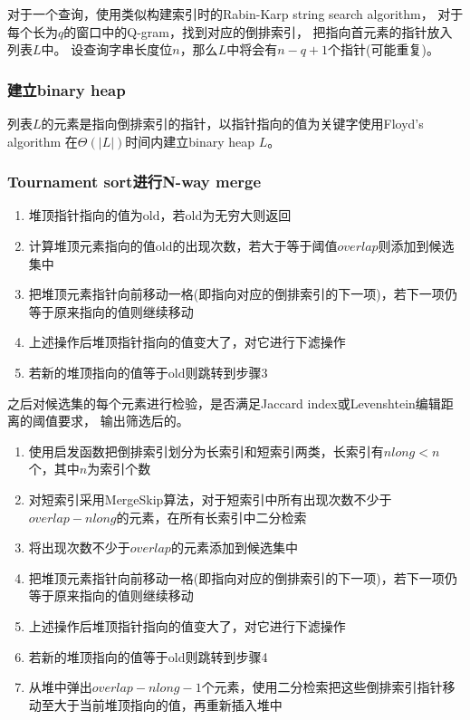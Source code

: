 对于一个查询，使用类似构建索引时的Rabin-Karp string search algorithm，
对于每个长为$q$的窗口中的Q-gram，找到对应的倒排索引，
把指向首元素的指针放入列表$L$中。
设查询字串长度位$n$，那么$L$中将会有$n-q+1$个指针(可能重复)。

\subsubsection{建立binary heap}

列表$L$的元素是指向倒排索引的指针，以指针指向的值为关键字使用Floyd's algorithm
在$\Theta(|L|)$时间内建立binary heap $L$。

\subsubsection{Tournament sort进行N-way merge}

\begin{enumerate}
  \item 堆顶指针指向的值为$\mathrm{old}$，若old为无穷大则返回
  \item 计算堆顶元素指向的值$\mathrm{old}$的出现次数，若大于等于阈值$\mathit{overlap}$则添加到候选集中
  \item 把堆顶元素指针向前移动一格(即指向对应的倒排索引的下一项)，若下一项仍等于原来指向的值则继续移动
  \item 上述操作后堆顶指针指向的值变大了，对它进行下滤操作
  \item 若新的堆顶指向的值等于$\mathrm{old}$则跳转到步骤3
\end{enumerate}

之后对候选集的每个元素进行检验，是否满足Jaccard index或Levenshtein编辑距离的阈值要求，
输出筛选后的。

\begin{enumerate}
  \item 使用启发函数把倒排索引划分为长索引和短索引两类，长索引有$\mathit{nlong}<\mathit{n}$个，其中$n$为索引个数
  \item 对短索引采用MergeSkip算法，对于短索引中所有出现次数不少于$\mathit{overlap}-\mathit{nlong}$的元素，在所有长索引中二分检索
  \item 将出现次数不少于$\mathit{overlap}$的元素添加到候选集中
  \item 把堆顶元素指针向前移动一格(即指向对应的倒排索引的下一项)，若下一项仍等于原来指向的值则继续移动
  \item 上述操作后堆顶指针指向的值变大了，对它进行下滤操作
  \item 若新的堆顶指向的值等于$\mathrm{old}$则跳转到步骤4
  \item 从堆中弹出$\mathit{overlap}-\mathit{nlong}-1$个元素，使用二分检索把这些倒排索引指针移动至大于当前堆顶指向的值，再重新插入堆中
\end{enumerate}

